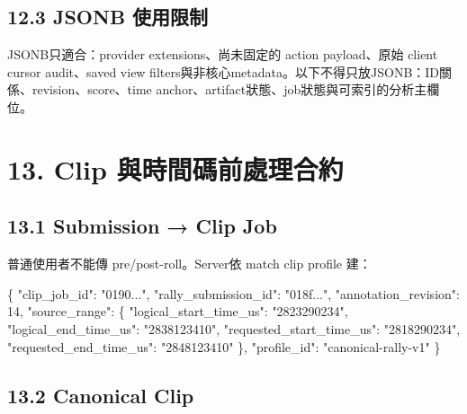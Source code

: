 \documentclass[
  9pt,
  a4paper,
]{article}
\newenvironment{Shaded}{}{}
\newcommand{\DataTypeTok}[1]{\textcolor[rgb]{0.56,0.13,0.00}{#1}}
\newcommand{\DecValTok}[1]{\textcolor[rgb]{0.25,0.63,0.44}{#1}}
\newcommand{\FunctionTok}[1]{\textcolor[rgb]{0.02,0.16,0.49}{#1}}
\newcommand{\StringTok}[1]{\textcolor[rgb]{0.25,0.44,0.63}{#1}}
\begin{document}
\subsection{12.3 JSONB
使用限制}\label{123-jsonb-ux4f7fux7528ux9650ux5236}

JSONB只適合：provider extensions、尚未固定的 action payload、原始 client
cursor audit、saved view
filters與非核心metadata。以下不得只放JSONB：ID關係、revision、score、time
anchor、artifact狀態、job狀態與可索引的分析主欄位。

\section{13. Clip
與時間碼前處理合約}\label{13-clip-ux8207ux6642ux9593ux78bcux524dux8655ux7406ux5408ux7d04}

\subsection{13.1 Submission → Clip Job}\label{131-submission--clip-job}

普通使用者不能傳 pre/post-roll。Server依 match clip profile 建：

\begin{Shaded}
\begin{Highlighting}[]
\FunctionTok{\{}
  \DataTypeTok{"clip\_\allowbreak{}job\_\allowbreak{}id"}\FunctionTok{:} \StringTok{"0190..."}\FunctionTok{,}
  \DataTypeTok{"rally\_\allowbreak{}submission\_\allowbreak{}id"}\FunctionTok{:} \StringTok{"018f..."}\FunctionTok{,}
  \DataTypeTok{"annotation\_\allowbreak{}revision"}\FunctionTok{:} \DecValTok{14}\FunctionTok{,}
  \DataTypeTok{"source\_\allowbreak{}range"}\FunctionTok{:} \FunctionTok{\{}
    \DataTypeTok{"logical\_\allowbreak{}start\_\allowbreak{}time\_\allowbreak{}us"}\FunctionTok{:} \StringTok{"2823290234"}\FunctionTok{,}
    \DataTypeTok{"logical\_\allowbreak{}end\_\allowbreak{}time\_\allowbreak{}us"}\FunctionTok{:} \StringTok{"2838123410"}\FunctionTok{,}
    \DataTypeTok{"requested\_\allowbreak{}start\_\allowbreak{}time\_\allowbreak{}us"}\FunctionTok{:} \StringTok{"2818290234"}\FunctionTok{,}
    \DataTypeTok{"requested\_\allowbreak{}end\_\allowbreak{}time\_\allowbreak{}us"}\FunctionTok{:} \StringTok{"2848123410"}
  \FunctionTok{\},}
  \DataTypeTok{"profile\_\allowbreak{}id"}\FunctionTok{:} \StringTok{"canonical{-}rally{-}v1"}
\FunctionTok{\}}
\end{Highlighting}
\end{Shaded}

\subsection{13.2 Canonical Clip}\label{132-canonical-clip}
\end{document}
